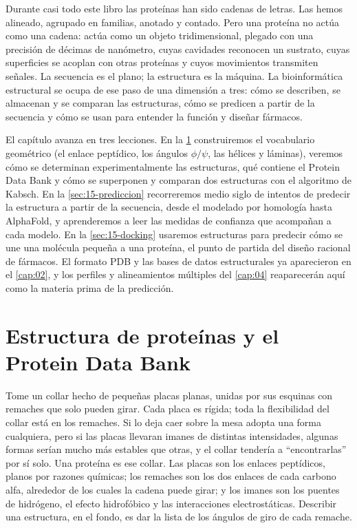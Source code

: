 Durante casi todo este libro las proteínas han sido cadenas de letras. Las hemos alineado, agrupado en familias, anotado y contado. Pero una proteína no actúa como una cadena: actúa como un objeto tridimensional, plegado con una precisión de décimas de nanómetro, cuyas cavidades reconocen un sustrato, cuyas superficies se acoplan con otras proteínas y cuyos movimientos transmiten señales. La secuencia es el plano; la estructura es la máquina. La bioinformática estructural se ocupa de ese paso de una dimensión a tres: cómo se describen, se almacenan y se comparan las estructuras, cómo se predicen a partir de la secuencia y cómo se usan para entender la función y diseñar fármacos.

El capítulo avanza en tres lecciones. En la \cref{sec:15-estructura} construiremos el vocabulario geométrico (el enlace peptídico, los ángulos $\phi/\psi$, las hélices y láminas), veremos cómo se determinan experimentalmente las estructuras, qué contiene el Protein Data Bank y cómo se superponen y comparan dos estructuras con el algoritmo de Kabsch. En la \cref{sec:15-prediccion} recorreremos medio siglo de intentos de predecir la estructura a partir de la secuencia, desde el modelado por homología hasta AlphaFold, y aprenderemos a leer las medidas de confianza que acompañan a cada modelo. En la \cref{sec:15-docking} usaremos estructuras para predecir cómo se une una molécula pequeña a una proteína, el punto de partida del diseño racional de fármacos. El formato PDB y las bases de datos estructurales ya aparecieron en el \cref{cap:02}, y los perfiles y alineamientos múltiples del \cref{cap:04} reaparecerán aquí como la materia prima de la predicción.

\section{Estructura de proteínas y el Protein Data Bank}\label{sec:15-estructura}

\begin{intuicion}
Tome un collar hecho de pequeñas placas planas, unidas por sus esquinas con remaches que solo pueden girar. Cada placa es rígida; toda la flexibilidad del collar está en los remaches. Si lo deja caer sobre la mesa adopta una forma cualquiera, pero si las placas llevaran imanes de distintas intensidades, algunas formas serían mucho más estables que otras, y el collar tendería a ``encontrarlas'' por sí solo. Una proteína es ese collar. Las placas son los enlaces peptídicos, planos por razones químicas; los remaches son los dos enlaces de cada carbono alfa, alrededor de los cuales la cadena puede girar; y los imanes son los puentes de hidrógeno, el efecto hidrofóbico y las interacciones electrostáticas. Describir una estructura, en el fondo, es dar la lista de los ángulos de giro de cada remache.
\end{intuicion}

